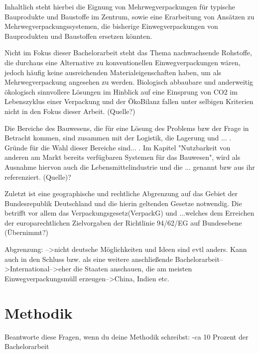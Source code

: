 Inhaltlich steht hierbei die Eignung von Mehrwegverpackungen für typische Bauprodukte und
Baustoffe im Zentrum, sowie eine Erarbeitung von Ansätzen zu Mehrwegverpackungssystemen, die bisherige Einwegverpackungen von Bauprodukten und Baustoffen ersetzen könnten. 

Nicht im Fokus dieser Bachelorarbeit steht das Thema nachwachsende Rohstoffe, die durchaus eine Alternative zu konventionellen Einwegverpackungen wären, jedoch häufig keine ausreichenden Materialeigenschaften haben, um als Mehrwegverpackung angesehen zu werden. Biologisch abbaubare und anderweitig ökologisch sinnvollere Lösungen im Hinblick auf eine Einsprung von CO2 im Lebenszyklus einer Verpackung und der ÖkoBilanz fallen unter selbigen Kriterien nicht in den Fokus dieser Arbeit. (Quelle?)

Die Bereiche des Bauwesens, die für eine Lösung des Problems bzw der Frage in Betracht kommen, sind zusammen mit der Logistik, die Lagerung und ... . Gründe für die Wahl dieser Bereiche sind... . Im Kapitel "Nutzbarkeit von anderen am Markt bereits verfügbaren Systemen für das Bauwesen", wird als Ausnahme hiervon auch die Lebensmittelindustrie und die ... genannt bzw aus ihr referenziert. (Quelle)?

Zuletzt ist eine geographische und rechtliche Abgrenzung auf das Gebiet der Bundesrepublik Deutschland und die hierin geltenden Gesetze notwendig. Die betrifft vor allem das  Verpackungsgesetz(VerpackG) und ...welches dem Erreichen der europarechtlichen Zielvorgaben der Richtlinie 94/62/EG auf Bundesebene (Übernimmt?)

Abgrenzung: 
        -->nicht deutsche Möglichkeiten und Ideen sind evtl anders. Kann auch in den Schluss bzw. als eine weitere anschließende Bachelorarbeit-->International-->eher die Staaten anschauen, die am meisten Einwegverpackungsmüll erzeugen-->China, Indien etc.



\section{Methodik}
\label{sec:Einführung:Methodik}

Beantworte diese Fragen, wenn du deine Methodik schreibst:
            -ca 10 Prozent der Bachelorarbeit
    

